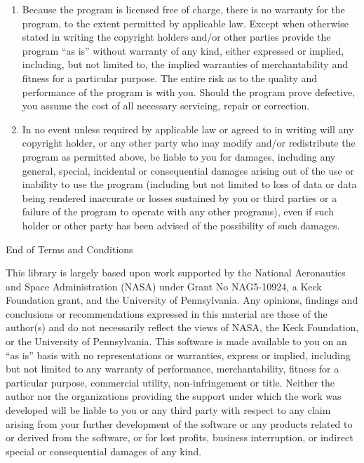 \documentclass[twoside,letterpaper,11pt]{article}
\begin{document}
\begin{enumerate}
\begin{center}
{\Large\sc
No Warranty
}
\end{center}

\item
{\sc Because the program is licensed free of charge, there is no warranty
for the program, to the extent permitted by applicable law.  Except when
otherwise stated in writing the copyright holders and/or other parties
provide the program ``as is'' without warranty of any kind, either expressed
or implied, including, but not limited to, the implied warranties of
merchantability and fitness for a particular purpose.  The entire risk as
to the quality and performance of the program is with you.  Should the
program prove defective, you assume the cost of all necessary servicing,
repair or correction.}

\item
{\sc In no event unless required by applicable law or agreed to in writing
will any copyright holder, or any other party who may modify and/or
redistribute the program as permitted above, be liable to you for damages,
including any general, special, incidental or consequential damages arising
out of the use or inability to use the program (including but not limited
to loss of data or data being rendered inaccurate or losses sustained by
you or third parties or a failure of the program to operate with any other
programs), even if such holder or other party has been advised of the
possibility of such damages.}

\end{enumerate}


\begin{center}
{\Large\sc End of Terms and Conditions}
\end{center}

This library is largely based upon work supported by the 
National Aeronautics and Space Administration (NASA) under Grant No 
NAG5-10924, a Keck Foundation grant, and the University of Pennsylvania. 
Any opinions, findings and conclusions or recommendations expressed in this 
material are those of the author(s) and do not necessarily reflect the views 
of NASA, the Keck Foundation, or the University of Pennsylvania.
This software is made available to you on an ``as is'' basis with no 
representations or warranties, express or implied, including but not 
limited to any warranty of performance, merchantability, fitness for a 
particular purpose, commercial utility, non-infringement or title.  
Neither the author nor the organizations providing the support under 
which the work was developed will be liable to you or any third party 
with respect to any claim arising from your further development of the 
software or any products related to or derived from the software, or for 
lost profits, business interruption, or indirect special or consequential 
damages of any kind. 

\newpage
\printindex
\end{document}

